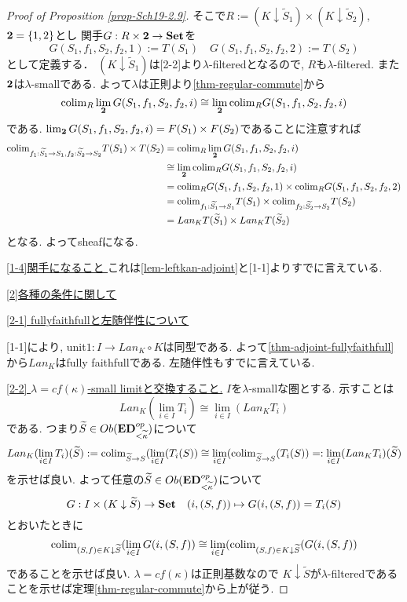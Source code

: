 \documentclass[dvipdfmx,a4paper,11pt]{article}
\newcommand{\colim}{{\rm colim}}
\theoremstyle{definition}
\begin{document}
\begin{proof}[Proof of Proposition \ref{prop-Sch19-2.9}]
そこで$R := (K \downarrow  \widetilde{S}_1) \times (K \downarrow  \widetilde{S}_2) $, ${\bf 2}=\{ 1,2\}$とし
関手$G : R \times {\bf 2} \to {\bf Set}$を
$$G(S_1, f_1, S_2, f_2, 1) := T(S_1)
\quad
G(S_1, f_1, S_2, f_2, 2) := T(S_2)
$$
として定義する．
$(K \downarrow  \widetilde{S}_1) $は[2-2]より$\lambda$-filteredとなるので, $R$も$\lambda$-filtered. 
また${\bf 2}$は$\lambda$-smallである. 
よって$\lambda$は正則より\ref{thm-regular-commute}から
$$
\colim_{R} \lim_{{\bf2}}G(S_1, f_1, S_2, f_2, i)
\cong 
\lim_{{\bf2}}\colim_{R} G(S_1, f_1, S_2, f_2, i)
$$
である. 
$\lim_{{\bf2}}G(S_1, f_1, S_2, f_2, i) =F(S_1) \times F (S_2)$であることに注意すれば
\begin{align*}
\begin{split}
\colim_{f_1 : \widetilde{S_1} \to S_1,  f_2 : \widetilde{S_2} \to S_2} T(S_1) \times  T( S_2)
&=\colim_{R} \lim_{{\bf2}}G(S_1, f_1, S_2, f_2, i)\\
& \cong \lim_{{\bf2}}\colim_{R} G(S_1, f_1, S_2, f_2, i) \\
&= \colim_{R} G(S_1, f_1, S_2, f_2, 1)  \times \colim_{R} G(S_1, f_1, S_2, f_2, 2) \\
&=\colim_{f_1 : \widetilde{S_1} \to S_1 } T(S_1) \times  \colim_{ f_2 : \widetilde{S_2} \to S_2}T( S_2) \\
&= Lan_{K}T(\widetilde{S}_1) \times Lan_{K}T(\widetilde{S}_2) 
\end{split}
\end{align*}
となる. 
よってsheafになる. 

\underline{[1-4]関手になること } 
これは\ref{lem-leftkan-adjoint}と[1-1]よりすでに言えている. 

\vspace{5pt}
\underline{[2]各種の条件に関して}

\underline{[2-1] fullyfaithfullと左随伴性について}

[1-1]により, unit$1 : I \to Lan_{K} \circ K$は同型である. 
よって\ref{thm-adjoint-fullyfaithfull}から$Lan_{K}$はfully faithfullである.
左随伴性もすでに言えている. 

\underline{[2-2] $\lambda=cf(\kappa)$-small limitと交換すること.}
$I$を$\lambda$-smallな圏とする.
示すことは
$$
Lan_{K}(\lim_{i \in I}T_{i})  \cong \lim_{i \in I}( Lan_{K} T_{i})
$$
である. つまり$\widetilde{S} \in Ob({\bf ED}_{<\widetilde{\kappa}}^{op})$について
$$
Lan_{K}(\lim_{i \in I}T_{i})(\widetilde{S} )
:=
\colim_{\widetilde{S} \to S} (\lim_{i \in I} (T_{i}(S) )
\cong
\lim_{i \in I}(\colim_{\widetilde{S} \to S} (T_{i} (S))
=:
\lim_{i \in I}( Lan_{K} T_{i})(\widetilde{S} )
$$
を示せば良い.
よって任意の$\widetilde{S} \in Ob({\bf ED}_{< \widetilde{\kappa}}^{op})$について
$$
G : I \times (K \downarrow \widetilde{S})
\to {\bf Set} 
\quad
(i,(S, f)) \mapsto G(i,(S, f))=T_{i}(S)
$$
とおいたときに
$$
\colim_{(S, f) \in K \downarrow \widetilde{S}}
 (\lim_{i \in I} G(i,(S, f))
\cong 
\lim_{i \in I}
(\colim_{(S, f) \in K \downarrow \widetilde{S}} ( G(i,(S, f))
$$
であることを示せば良い. 
$\lambda = cf(\kappa)$は正則基数なので
$K \downarrow \widetilde{S}$が$\lambda$-filteredであることを示せば定理\ref{thm-regular-commute}から上が従う. 


\end{proof}
\end{document}
